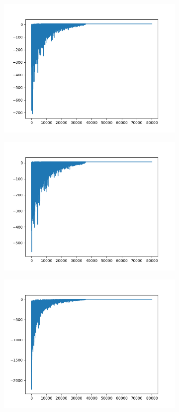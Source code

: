\begin{figure}[H]
	\begin{subfigure}{.25\textwidth}
		\includegraphics[width=\textwidth]{img/train/matrice_4-11_23_01.png}
	\end{subfigure}%
	\begin{subfigure}{.25\textwidth}
		\includegraphics[width=\textwidth]{img/train/matrice_5-11_23_42.png}
	\end{subfigure}%
	\begin{subfigure}{.25\textwidth}
		\includegraphics[width=\textwidth]{img/train/matrice_6-11_25_34.png}

\end{subfigure}
\end{figure}
